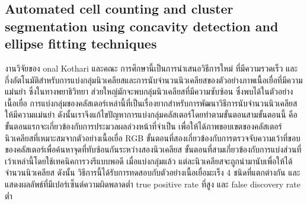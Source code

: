\documentclass[12pt,oneside,openright,a4paper]{cpe-thai-project}
\begin{document}
\subsection{Automated cell counting and cluster segmentation using concavity detection and ellipse fitting techniques}
งานวิจัยของ onal Kothari และคณะ \cite{33} การศึกษานี้เป็นการนำเสนอวิธีการใหม่ ที่มีความรวดเร็ว และกึ่งอัตโนมัติสำหรับการแบ่งกลุ่มนิวเคลียสและการนับจำนวนนิวเคลียสของตัวอย่างภาพเนื้อเยื่อที่มีความแม่นยำ ซึ่งในทางพยาธิวิทยา ส่วยใหญ่มักจะพบกลุ่มนิวเคลียสที่มีความซับซ้อน ซึ่งพบได้ในตัวอย่างเนื้อเยื่อ การแบ่งกลุ่มของคลัสเตอร์เหล่านี้ที่เป็นเรื่องยากสำหรับการพัฒนาวิธีการนับจำนวนนิวเคลียสให้มีความแม่นยำ ดังนั้นเราจึงแก้ไขปัญหาการแบ่งกลุ่มคลัสเตอร์โดยทำตามขั้นตอนสามขั้นตอนนี้ คือ ขั้นตอนแรกจะเกี่ยวข้องกับการประมวลผลล่วงหน้าที่จำเป็น เพื่อให้ได้ภาพขอบเขตของคลัสเตอร์นิวเคลียสที่เหมาะสมจากตัวอย่างเนื้อเยื่อ RGB ขั้นตอนที่สองเกี่ยวข้องกับการตรวจจับความเว้าที่ขอบของคลัสเตอร์เพื่อค้นหาจุดที่ทับซ้อนกันระหว่างสองนิวเคลียส ขั้นตอนที่สามเกี่ยวข้องกับการแบ่งส่วนที่เว้าเหล่านี้โดยใช้เทคนิคการวงรีแบบพอดี เมื่อแบ่งกลุ่มแล้ว แต่ละนิวเคลียสจะถูกนำมานับเพื่อให้ได้จำนวนนิวเคลียส ดังนั้น วิธีการนี้ได้รับการทดสอบกับตัวอย่างเนื้อเยื่อมะเร็ง 4 ชนิดที่แตกต่างกัน และแสดงผลลัพธ์ที่มีเปอร์เซ็นต์ความผิดพลาดต่ำ true positive rate ที่สูง และ false discovery rate ต่ำ
\end{document}
